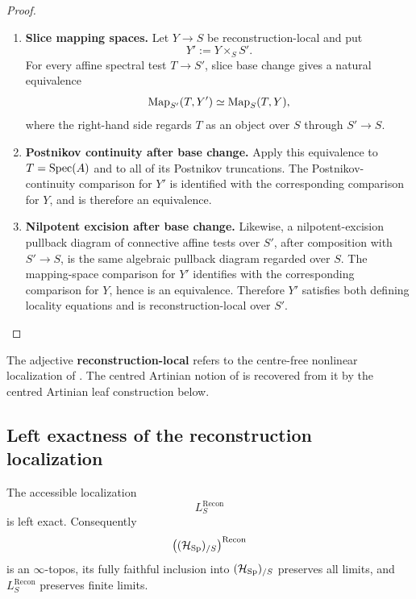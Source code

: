 \begin{proof}
\leavevmode
\begin{enumerate}[label=\textup{(\arabic*)}]
    \item \textbf{Slice mapping spaces.}
    Let \(Y\to S\) be reconstruction-local and put
    \[
        Y':=Y\times_SS'.
    \]
    For every affine spectral test \(T\to S'\), slice base change gives a natural
    equivalence
    \[
        \operatorname{Map}_{S'}(T,Y')
        \simeq
        \operatorname{Map}_S(T,Y),
    \]
    where the right-hand side regards \(T\) as an object over \(S\) through
    \(S'\to S\).
    \item \textbf{Postnikov continuity after base change.}
    Apply this equivalence to \(T=\operatorname{Spec}(A)\) and to all of its Postnikov
    truncations. The Postnikov-continuity comparison for \(Y'\) is identified
    with the corresponding comparison for \(Y\), and is therefore an
    equivalence.
    \item \textbf{Nilpotent excision after base change.}
    Likewise, a nilpotent-excision pullback diagram of connective affine tests
    over \(S'\), after composition with \(S'\to S\), is the same algebraic
    pullback diagram regarded over \(S\). The mapping-space comparison for
    \(Y'\) identifies with the corresponding comparison for \(Y\), hence is an
    equivalence. Therefore \(Y'\) satisfies both defining locality equations and
    is reconstruction-local over \(S'\).
\end{enumerate}
\end{proof}

\begin{remark}
\label{rem:reconstruction-local-versus-fmp}
The adjective \textbf{reconstruction-local} refers to the centre-free nonlinear
localization of . The centred
Artinian notion of  is recovered from
it by the centred Artinian leaf construction below.
\end{remark}

\subsection{Left exactness of the reconstruction localization}

\begin{theorem}
\label{thm:reconstruction-localization-left-exact}
The accessible localization
\[
    L^{\mathrm{Recon}}_S
\]
is left exact. Consequently
\[
    \bigl((\mathcal H_{\operatorname{Sp}})_{/S}\bigr)^{\mathrm{Recon}}
\]
is an \(\infty\)-topos, its fully faithful inclusion into
\((\mathcal H_{\operatorname{Sp}})_{/S}\) preserves all limits, and
\(L^{\mathrm{Recon}}_S\) preserves finite limits.
\end{theorem}

